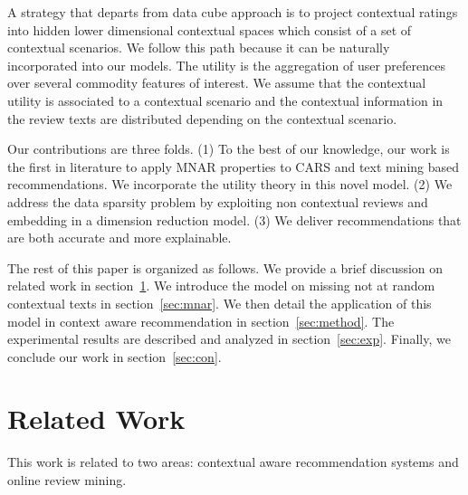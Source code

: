 \documentclass{llncs}
\begin{document}
A strategy that departs from data cube approach is to project contextual ratings into hidden lower dimensional contextual spaces which consist of a set of contextual scenarios. We follow this path because it can be naturally incorporated into our models. The utility is the aggregation of user preferences over several commodity features of interest.  We assume that the contextual utility is associated to a contextual scenario and the contextual information in the review texts are distributed depending on the contextual scenario.  



Our contributions are three folds. (1) To the best of our knowledge, our work is the first in literature to apply MNAR properties to CARS and text mining based recommendations.  We incorporate the utility theory in this novel model. (2) We address the data sparsity problem by exploiting non contextual reviews and embedding in a dimension reduction model. (3) We deliver recommendations that are both accurate and more explainable. 


The rest of this paper is organized as follows. We provide a brief discussion on related work in section~\ref{sec:related}. We introduce the model on missing not at random contextual texts in section~\ref{sec:mnar}. We then detail the application of this model in context aware recommendation in section~\ref{sec:method}. The experimental results are described and analyzed in section~\ref{sec:exp}. Finally, we conclude our work in section~\ref{sec:con}.

\section{Related Work}\label{sec:related}
This work is related to two areas: contextual aware recommendation systems and online review mining.
\end{document}
